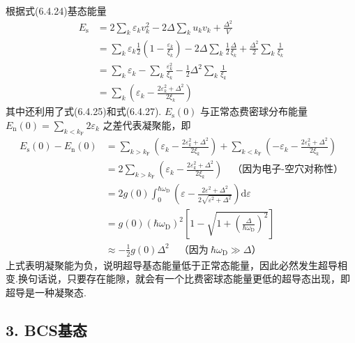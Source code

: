根据式(6.4.24)基态能量
\begin{equation}
\begin{aligned}
  E_{\mathrm{s}}&=2\sum_{k}\varepsilon_{k}v_{k}^{2}
  -2\Delta\sum_{k}u_{k}v_{k}+\frac{\Delta^{2}}{V}\\
  &=\sum_{k}\varepsilon_{k}\frac{1}{2}\left(1-\frac{\varepsilon_{k}}{\xi_{k}}\right)
  -2\Delta\sum_{k}\frac{1}{2}\frac{\Delta}{\xi_{k}}
  +\frac{\Delta^{2}}{2}\sum_{k}\frac{1}{\xi_{k}}\\
  &=\sum_{k}\varepsilon_{k}-\sum_{k}\frac{\varepsilon_{k}^{2}}{\xi_{k}}
  -\frac{1}{2}\Delta^{2}\sum_{k}\frac{1}{\xi_{k}}\\
  &=\sum_{k}\left(\varepsilon_{k}
  -\frac{2\varepsilon_{k}^{2}+\Delta^{2}}{2\xi_{k}}\right)
\end{aligned}
\end{equation}
其中还利用了式(6.4.25)和式(6.4.27). $E_{\mathrm{s}}(0)$ 与正常态费密球分布能量 $E_{\mathrm{n}}(0)=\sum_{k<k_{\mathrm{F}}}2\varepsilon_{k}$ 之差代表凝聚能，即
\begin{equation}
\begin{aligned}
  E_{\mathrm{s}}(0)-E_{\mathrm{n}}(0)
  &=\sum_{k>k_{\mathrm{F}}}\left(\varepsilon_{k}
  -\frac{2\varepsilon_{k}^{2}+\Delta^{2}}{2\xi_{k}}\right)
  +\sum_{k<k_{\mathrm{F}}}\left(-\varepsilon_{k}
  -\frac{2\varepsilon_{k}^{2}+\Delta^{2}}{2\xi_{k}}\right)\\
  &=2\sum_{k>k_{\mathrm{F}}}\left(\varepsilon_{k}
  -\frac{2\varepsilon_{k}^{2}+\Delta^{2}}{2\xi_{k}}\right)
  \quad\text{（因为电子-空穴对称性）}\\
  &=2g(0)\int_{0}^{\hbar\omega_{\mathrm{D}}}
  \left(\varepsilon-\frac{2\varepsilon^{2}+\Delta^{2}}
  {2\sqrt{\varepsilon^{2}+\Delta^{2}}}\right)\mathrm{d}\varepsilon\\
  &=g(0)\left(\hbar\omega_{\mathrm{D}}\right)^{2}
  \left[1-\sqrt{1+\left(\frac{\Delta}{\hbar\omega_{\mathrm{D}}}\right)^{2}}\right]\\
  &\approx-\frac{1}{2}g(0)\Delta^{2}
  \quad\text{（因为}\ \hbar\omega_{\mathrm{D}}\gg\Delta\text{）}
\end{aligned}
\end{equation}
上式表明凝聚能为负，说明超导基态能量低于正常态能量，因此必然发生超导相变.换句话说，只要存在能隙，就会有一个比费密球态能量更低的超导态出现，即超导是一种凝聚态.

\subsection*{3. BCS基态}

